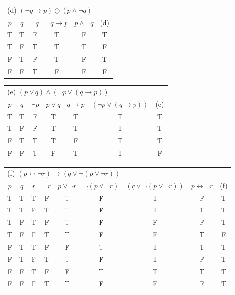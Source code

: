 \documentclass[11pt,addpoints]{exam}
\newcommand{\ra}{\rightarrow}
\newcommand{\lra}{\leftrightarrow}
\newcommand{\xor}{\oplus}
\begin{document}
\begin{questions}
\begin{solution}
        \smallskip
        \begin{tabular}{c|c|c||c|c|c} 
            \multicolumn{6}{l}{(d) $(\neg q \ra p) \xor (p \wedge \neg q)$ } \\
            $p$ & $q$ & $\neg q$ & $\neg q \ra p$ & $p \wedge \neg q$ & (d)  \\
         \hline
            T & T & F & T & F  & T   \\
            T & F & T & T & T  & F  \\
            F & T & F & T & F  & T  \\
            F & F & T & F & F  & F  \\
        \end{tabular} \hspace{0.5in}
        \begin{tabular}{c|c|c||c|c|c|c} 
            \multicolumn{7}{l}{(e) $(p \vee q) \wedge (\neg p \vee (q \ra p))$} \\
            $p$ & $q$ & $\neg p$ & $p \vee q$ & $q \ra p$ & $(\neg p \vee (q \ra p))$ & (e) \\
         \hline
            T & T & F & T & T  & T  & T \\
            T & F & F & T & T  & T  & T \\
            F & T & T & T & F  & T  & T \\
            F & F & T & F & T  & T  & F \\
        \end{tabular}

        \smallskip
        \begin{tabular}{c|c|c|c||c|c|c|c|c}
            \multicolumn{9}{l}{(f) $(p \lra \neg r) \ra (q \vee \neg (p \vee \neg r))$ } \\
            $p$ & $q$ & $r$ & $\neg r$ 
             & $p \vee \neg r$ & $\neg (p \vee \neg r)$ 
             & $(q \vee \neg (p \vee \neg r))$ & $p \lra \neg r$ & (f) \\
         \hline
            T & T & T & F  & T & F & T  & F & T \\
            T & T & F & T  & T & F & T  & T & T \\
            T & F & T & F  & T & F & F  & F & T \\
            T & F & F & T  & T & F & F  & T & F \\
          \hline
            F & T & T & F  & F & T & T  & T & T \\
            F & T & F & T  & T & F & T  & F & T \\
            F & F & T & F  & F & T & T  & T & T \\
            F & F & F & T  & T & F & F  & F & T
         \end{tabular} 
    \end{solution}



\end{questions}
\end{document}
